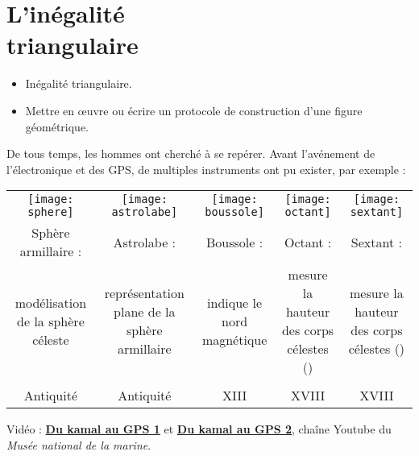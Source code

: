 \themaG
\graphicspath{{../../S15_Inegalite_triangulaire/Images/}}

\chapter{L'inégalité\\triangulaire}
\label{S15}


\begin{prerequis}
   \begin{itemize}
      \item Inégalité triangulaire.
      \item[\com] Mettre en \oe uvre ou écrire un protocole de construction d’une figure géométrique.
   \end{itemize}
\end{prerequis}

\vfill

\begin{debat} 
   De tous temps, les hommes ont cherché à se repérer. Avant l'avénement de l'électronique et des GPS, de multiples instruments ont pu exister, par exemple : 
   \begin{center}
   \textcolor{B1}{\small
      \begin{tabular}{*{5}{C{3}}}
         \texttt{[image: sphere]} & \texttt{[image: astrolabe]} & \texttt{[image: boussole]}  & \texttt{[image: octant]} & \texttt{[image: sextant]} \\
        Sphère armillaire : & Astrolabe : & Boussole : & Octant : & Sextant : \\
        modélisation de la sphère céleste & représentation plane de la sphère armillaire & indique le nord magnétique & mesure la hauteur des corps célestes () & mesure la hauteur des corps célestes () \\
        & & & & \\
        Antiquité & Antiquité & {\small XIII} & {\small XVIII} & {\small XVIII} \\
     \end{tabular}}
   \end{center}
   \bigskip
   \begin{cadre}[B2][F4]
      \begin{center}
         Vidéo : \href{https://www.youtube.com/watch?v=E0KvuFx0Mr8}{\bf Du kamal au GPS 1} et \href{https://www.youtube.com/watch?v=Jv21tvyZokk}{\bf Du kamal au GPS 2}, chaîne Youtube du {\it Musée national de la marine}. 
      \end{center}
   \end{cadre}
\end{debat}

